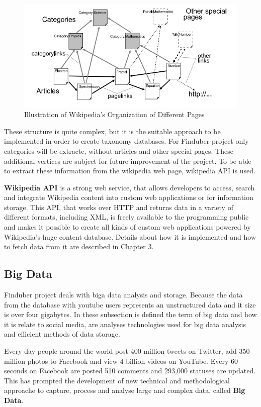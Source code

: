 \begin{figure}[!ht]
\centering
\includegraphics[width=15cm]{categorytreewiki}
\caption{Illustration of Wikipedia’s Organization of Different Pages}\label{category-tree-wiki}
\end{figure}

These structure is quite complex, but it is the suitable approach to be implemented in order to create taxonomy databases. For Finduber project only categories will be extracte, without articles and other special pages. These additional vertices are subject for future improvement of the project. To be able to extract these information from the wikipedia web page, wikipedia API is used.

\textbf{Wikipedia API} is a strong web service, that allows developers to access, search and integrate Wikipedia content into custom web applications or for information storage. This API, that works over HTTP and returns data in a variety of different formats, including XML, is freely available to the programming public and makes it possible to create all kinds of custom web applications powered by Wikipedia's huge content database. \cite{wikipediAPI} Details about how it is implemented and how to fetch data from it are described in Chapter 3.

\subsection{Big Data}

Finduber project deals with biga data analysis and storage. Because the data from the database with youtube users represents an unstructured data and it size is over four gigabytes. In these subsection is defined the term of big data and how it is relate to social media, are analyses technologies used for big data analysis and efficient methods of data storage. 

Every day people around the world post 400 million tweets on Twitter, add 350 million photos to Facebook and view 4 billion videos on YouTube.\cite{digitalInfo} Every 60 seconds on Facebook are posted 510 comments and 293,000 statuses are updated.\cite{zephoria} This has prompted the development of new technical and methodological approache to capture, process and analyse large and complex data, called \textbf{Big Data}. 

